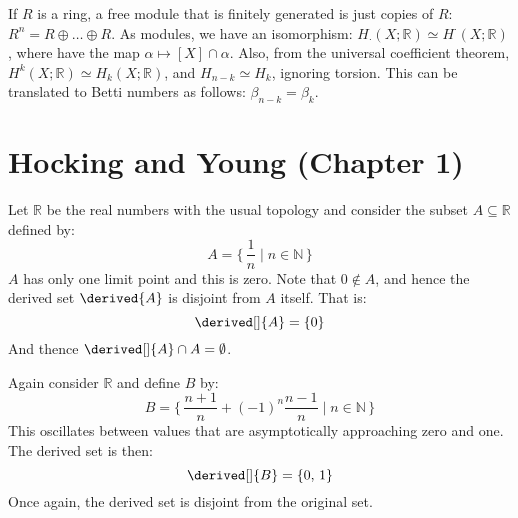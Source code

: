 \documentclass{book}                                                           %
\begin{document}
            If $R$ is a ring, a free module that is finitely generated
            is just copies of $R$: $R^{n}=R\oplus\dots\oplus{R}$. As
            modules, we have an isomorphism:
            $H_{\cdot}(X;\mathbb{R})\simeq{H}^{\cdot}(X;\mathbb{R})$,
            where have the map $\alpha\mapsto[X]\cap\alpha$. Also, from
            the universal coefficient theorem,
            $H^{k}(X;\mathbb{R})\simeq{H}_{k}(X;\mathbb{R})$, and
            $H_{n-k}\simeq{H}_{k}$, ignoring torsion. This can be
            translated to Betti numbers as follows:
            $\beta_{n-k}=\beta_{k}$.
            \section{Hocking and Young (Chapter 1)}
            \begin{example}
                Let $\mathbb{R}$ be the real numbers with the usual topology and
                consider the subset $A\subseteq\mathbb{R}$ defined by:
                \begin{equation}
                    A=\Big\{\,\frac{1}{n}\;|\;n\in\mathbb{N}\,\Big\}
                \end{equation}
                $A$ has only one limit point and this is zero. Note that
                $0\notin{A}$, and hence the derived set $\derived{A}$ is disjoint
                from $A$ itself. That is:
                \begin{equation}
                    \derived[]{A}=\{0\}
                \end{equation}
                And thence $\derived[]{A}\cap{A}=\emptyset$.
            \end{example}
            \begin{example}
                Again consider $\mathbb{R}$ and define $B$ by:
                \begin{equation}
                    B=\Big\{\,\frac{n+1}{n}+(\minus{1})^{n}\frac{n-1}{n}\;|\;
                        n\in\mathbb{N}\,\Big\}
                \end{equation}
                This oscillates between values that are asymptotically approaching
                zero and one. The derived set is then:
                \begin{equation}
                    \derived[]{B}=\{0,\,1\}
                \end{equation}
                Once again, the derived set is disjoint from the original set.
            \end{example}
\end{document}
